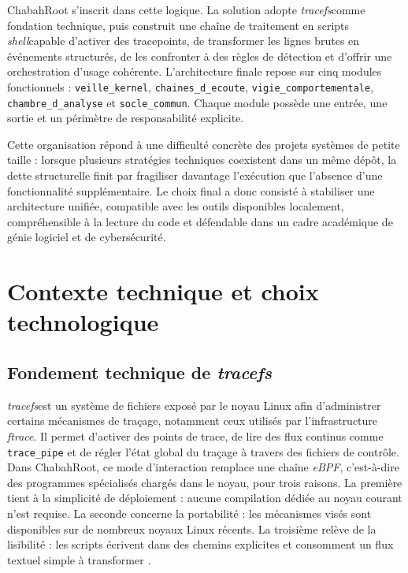 \documentclass[12pt,a4paper]{report}
\newcommand{\tracefs}{\textit{tracefs}}
\newcommand{\ebpf}{\textit{eBPF}}
\newcommand{\shellterm}{\textit{shell}}
\begin{document}
ChabahRoot s’inscrit dans cette logique. La solution adopte \tracefs comme fondation technique, puis construit une chaîne de traitement en scripts \shellterm capable d’activer des tracepoints, de transformer les lignes brutes en événements structurés, de les confronter à des règles de détection et d’offrir une orchestration d’usage cohérente. L’architecture finale repose sur cinq modules fonctionnels : \texttt{veille\_kernel}, \texttt{chaines\_d\_ecoute}, \texttt{vigie\_comportementale}, \texttt{chambre\_d\_analyse} et \texttt{socle\_commun}. Chaque module possède une entrée, une sortie et un périmètre de responsabilité explicite.

Cette organisation répond à une difficulté concrète des projets systèmes de petite taille : lorsque plusieurs stratégies techniques coexistent dans un même dépôt, la dette structurelle finit par fragiliser davantage l’exécution que l’absence d’une fonctionnalité supplémentaire. Le choix final a donc consisté à stabiliser une architecture unifiée, compatible avec les outils disponibles localement, compréhensible à la lecture du code et défendable dans un cadre académique de génie logiciel et de cybersécurité.

\chapter{Contexte technique et choix technologique}
\section{Fondement technique de \tracefs}
\tracefs est un système de fichiers exposé par le noyau Linux afin d’administrer certains mécanismes de traçage, notamment ceux utilisés par l’infrastructure \textit{ftrace}. Il permet d’activer des points de trace, de lire des flux continus comme \texttt{trace\_pipe} et de régler l’état global du traçage à travers des fichiers de contrôle. Dans ChabahRoot, ce mode d’interaction remplace une chaîne \ebpf, c’est-à-dire des programmes spécialisés chargés dans le noyau, pour trois raisons. La première tient à la simplicité de déploiement : aucune compilation dédiée au noyau courant n’est requise. La seconde concerne la portabilité : les mécanismes visés sont disponibles sur de nombreux noyaux Linux récents. La troisième relève de la lisibilité : les scripts écrivent dans des chemins explicites et consomment un flux textuel simple à transformer \autocite{kernel-ftrace,kernel-debugging}.
\end{document}
